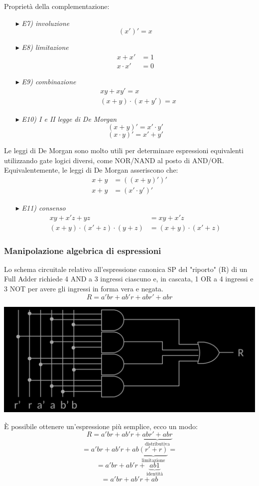 \documentclass{article}
\begin{document}
Proprietà della complementazione:
\begin{itemize}
    \item [$\blacktriangleright$] \textit{E7) involuzione}
    $$ (x')' = x $$
    \item [$\blacktriangleright$] \textit{E8) limitazione}
    \begin{align*}
        x + x' &= 1\\
        x \cdot x' &= 0
    \end{align*}
    \item [$\blacktriangleright$] \textit{E9) combinazione}
    \begin{align*}
        &xy + xy' = x\\
        &(x+y)\cdot (x+y') = x
    \end{align*}
    \item [$\blacktriangleright$] \textit{E10) I e II legge di De Morgan}
    $$ (x+y)'= x'\cdot y' $$
    $$ (x \cdot y)' = x'+ y' $$
\end{itemize}
Le leggi di De Morgan sono molto utili per determinare espressioni equivalenti utilizzando gate logici diversi, come NOR/NAND al posto di AND/OR.\\
Equivalentemente, le leggi di De Morgan asseriscono che:
\begin{align*}
    x +y &= ((x+y)')'\\
    x+y &= (x' \cdot y')'
\end{align*}
\begin{itemize}
    \item [$\blacktriangleright$] \textit{E11) consenso}
    \begin{align*}
        xy+x'z+yz &= xy + x'z\\
        (x+y)\cdot (x'+z)\cdot (y+z) &= (x+y)\cdot (x'+z)
    \end{align*}
\end{itemize}
\subsubsection{Manipolazione algebrica di espressioni}
Lo schema circuitale relativo all'espressione canonica SP del "riporto" (R) di un Full Adder richiede 4 AND a 3 ingressi ciascuno e, in cascata, 1 OR a 4 ingressi e 3 NOT per avere gli ingressi in forma vera e negata.
$$
    R = a'br+ab'r+abr'+abr
$$
\begin{center}
    \includegraphics[scale=0.35]{FullAdder1.png}
\end{center}
È possibile ottenere un'espressione più semplice, ecco un modo:
$$ R = a'br+ab'r+\underbrace{abr'+abr}_{\text{distributiva}} $$
$$= a'br+ab'r+ ab\underbrace{(r'+r)}_{\text{limitazione}} = $$
$$= a'br+ab'r+ \underbrace{ab1}_{\text{identità}} $$
$$ = a'br+ab'r+ ab $$
\end{document}
